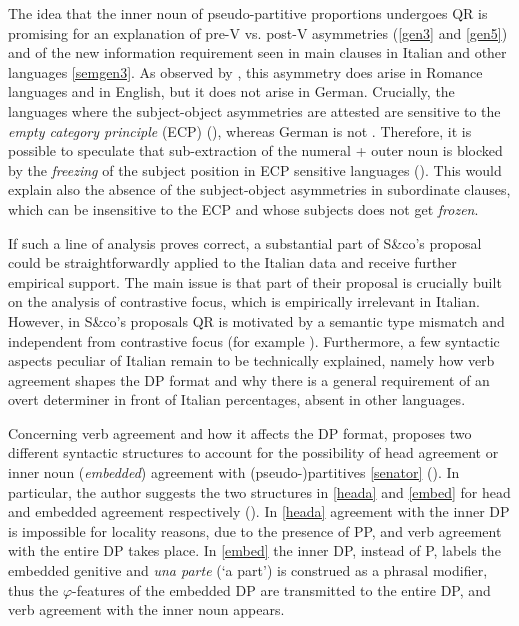 \documentclass[charis, linguex]{glossa}
\begin{document}
The idea that the inner noun of pseudo-partitive proportions undergoes QR is promising for an explanation of pre-V vs. post-V asymmetries (\ref{gen3} and \ref{gen5}) and of the new information requirement seen in main clauses in Italian and other languages \ref{semgen3}. As observed by \citet[Table1]{ahn17}, this asymmetry does arise in Romance languages and in English, but it does not arise in German. Crucially, the languages where the subject-object asymmetries are attested are sensitive to the \textit{empty category principle} (ECP) (\citealt[\S\S4.4]{cho81}), whereas German is not \citep{riz90}. Therefore, it is possible to speculate that sub-extraction of the numeral + outer noun is blocked by the \textit{freezing} of the subject position in ECP sensitive languages (\citealt{riz06}). This would explain also the absence of the subject-object asymmetries in subordinate clauses, which can be insensitive to the ECP and whose subjects does not get \textit{frozen}. 

If such a line of analysis proves correct, a substantial part of S\&co's proposal could be straightforwardly applied to the Italian data and receive further empirical support. The main issue is that part of their proposal is crucially built on the analysis of contrastive focus, which is empirically irrelevant in Italian. However, in S\&co's proposals QR is motivated by a semantic type mismatch and independent from contrastive focus (for example \citealt[\S\S\S4.3.1]{pas22}). Furthermore, a few syntactic aspects peculiar of Italian remain to be technically explained, namely how verb agreement shapes the DP format and why there is a general requirement of an overt determiner in front of Italian percentages, absent in other languages. 

Concerning verb agreement and how it affects the DP format, \citet[\S1]{man19} proposes two different syntactic structures to account for the possibility of head agreement or inner noun (\textit{embedded}) agreement with (pseudo-)partitives \ref{senator} (\citealt[ex.3]{man19}). In particular, the author suggests the two structures in \ref{heada} and \ref{embed} for head and embedded agreement respectively (\citealt[ex.5,6]{man19}). In \ref{heada} agreement with the inner DP is impossible for locality reasons, due to the presence of PP, and verb agreement with the entire DP takes place. In \ref{embed} the inner DP, instead of P, labels the embedded genitive and \textit{una parte} (`a part') is construed as a phrasal modifier, thus the $\varphi$-features of the embedded DP are transmitted to the entire DP, and verb agreement with the inner noun appears.
\end{document}
